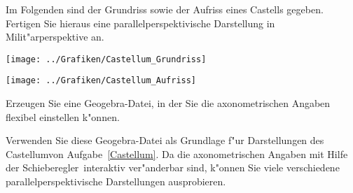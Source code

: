 \small
\begin{Aufgabe}
Im Folgenden sind der Grundriss sowie der Aufriss eines Castells gegeben. Fertigen Sie hieraus eine parallelperspektivische Darstellung in Milit"arperspektive an.

\texttt{[image: ../Grafiken/Castellum\_Grundriss]}

\texttt{[image: ../Grafiken/Castellum\_Aufriss]}
\end{Aufgabe}
\begin{Aufgabe}
\begin{Teilaufgaben}
\item Erzeugen Sie eine Geogebra-Datei, in der Sie die axonometrischen Angaben flexibel einstellen k"onnen.
\item Verwenden Sie diese Geogebra-Datei als Grundlage f"ur Darstellungen des \glqq Castellum\grqq von Aufgabe~\ref{Castellum}. Da die axonometrischen Angaben mit Hilfe der \glqq Schieberegler\grqq\ interaktiv ver"anderbar sind, k"onnen Sie viele verschiedene parallelperspektivische Darstellungen ausprobieren.
\end{Teilaufgaben}
\end{Aufgabe}
%

